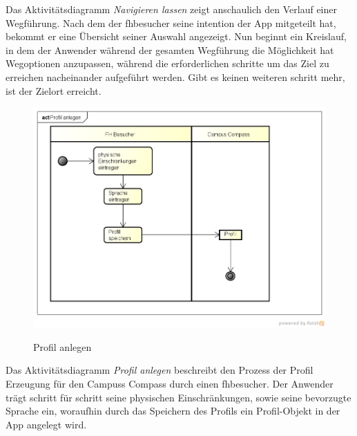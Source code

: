 Das Aktivitätsdiagramm \emph{Navigieren lassen} zeigt anschaulich den Verlauf einer Wegführung. Nach dem der \gls{fhbesucher} seine \gls{intention} der App mitgeteilt hat, bekommt er eine Übersicht seiner Auswahl angezeigt. Nun beginnt ein Kreislauf, in dem der Anwender während der gesamten Wegführung die Möglichkeit hat Wegoptionen anzupassen, während die erforderlichen \gls{schritt}e um das Ziel zu erreichen nacheinander aufgeführt werden. Gibt es keinen weiteren \gls{schritt} mehr, ist der Zielort erreicht.

\begin{figure}[hbt]
  \centering
  \includegraphics[width=\linewidth]{img/akt_profil_anlegen.png}
  \label{img:akt_profil_anlegen}
  \caption{Profil anlegen}
\end{figure}

\noindent Das Aktivitätsdiagramm \emph{Profil anlegen} beschreibt den Prozess der Profil Erzeugung für den Campuss Compass durch einen \gls{fhbesucher}. Der Anwender trägt \gls{schritt} für \gls{schritt} seine physischen Einschränkungen, sowie seine bevorzugte Sprache ein, woraufhin durch das Speichern des Profils ein Profil-Objekt in der App angelegt wird.
